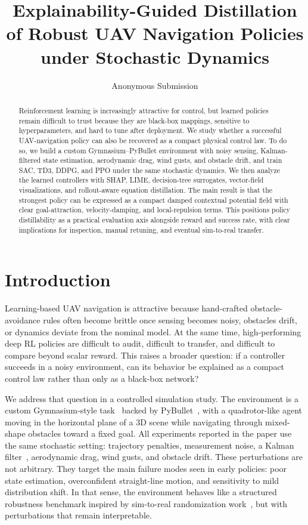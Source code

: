 \documentclass[runningheads]{llncs}
\title{Explainability-Guided Distillation of Robust UAV Navigation Policies under Stochastic Dynamics}
\author{Anonymous Submission}
\institute{Affiliation withheld for review}
\begin{document}
\maketitle

\begin{abstract}
Reinforcement learning is increasingly attractive for control, but learned policies remain difficult to trust because they are black-box mappings, sensitive to hyperparameters, and hard to tune after deployment. We study whether a successful UAV-navigation policy can also be recovered as a compact physical control law. To do so, we build a custom Gymnasium--PyBullet environment with noisy sensing, Kalman-filtered state estimation, aerodynamic drag, wind gusts, and obstacle drift, and train SAC, TD3, DDPG, and PPO under the same stochastic dynamics. We then analyze the learned controllers with SHAP, LIME, decision-tree surrogates, vector-field visualizations, and rollout-aware equation distillation. The main result is that the strongest policy can be expressed as a compact damped contextual potential field with clear goal-attraction, velocity-damping, and local-repulsion terms. This positions policy distillability as a practical evaluation axis alongside reward and success rate, with clear implications for inspection, manual retuning, and eventual sim-to-real transfer.
\end{abstract}

\section{Introduction}
Learning-based UAV navigation is attractive because hand-crafted obstacle-avoidance rules often become brittle once sensing becomes noisy, obstacles drift, or dynamics deviate from the nominal model. At the same time, high-performing deep RL policies are difficult to audit, difficult to transfer, and difficult to compare beyond scalar reward. This raises a broader question: if a controller succeeds in a noisy environment, can its behavior be explained as a compact control law rather than only as a black-box network?

We address that question in a controlled simulation study. The environment is a custom Gymnasium-style task~\cite{Brockman2016Gym} backed by PyBullet~\cite{Coumans2021PyBullet}, with a quadrotor-like agent moving in the horizontal plane of a 3D scene while navigating through mixed-shape obstacles toward a fixed goal. All experiments reported in the paper use the same stochastic setting: trajectory penalties, measurement noise, a Kalman filter~\cite{Kalman1960}, aerodynamic drag, wind gusts, and obstacle drift. These perturbations are not arbitrary. They target the main failure modes seen in early policies: poor state estimation, overconfident straight-line motion, and sensitivity to mild distribution shift. In that sense, the environment behaves like a structured robustness benchmark inspired by sim-to-real randomization work~\cite{Tobin2017DomainRandomization,Peng2018DynamicsRandomization}, but with perturbations that remain interpretable.
\end{document}
